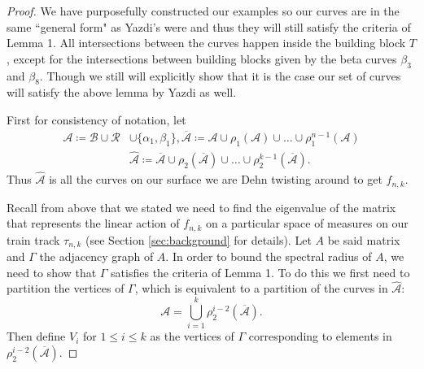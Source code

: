 \begin{proof}
We have purposefully constructed our examples so our curves are in the same ``general form" as Yazdi's were and thus they will still satisfy the criteria of Lemma 1. All intersections between the curves happen inside the building block $T$, except for the intersections between building blocks given by the beta curves $\beta_3$ and $\beta_8$. Though we still will explicitly show that it is the case our set of curves will satisfy the above lemma by Yazdi as well.

First for consistency of notation, let
\begin{align*}
    \mathcal{A} \coloneqq \mathcal{B} \cup \mathcal{R} &\cup \{\alpha_1,\beta_1\}, \overline{\mathcal{A}} \coloneqq \mathcal{A} \cup \rho_1(\mathcal{A}) \cup \dots \cup \rho_1^{n-1}(\mathcal{A}) \\
    &\hat{\mathcal{A}} \coloneqq \overline{\mathcal{A}} \cup \rho_2(\overline{\mathcal{A}}) \cup \dots \cup \rho_2^{k-1}(\overline{\mathcal{A}}).
\end{align*}
Thus $\hat{\mathcal{A}}$ is all the curves on our surface we are Dehn twisting around to get $f_{n,k}$.

Recall from above that we stated we need to find the eigenvalue of the matrix that represents the linear action of $f_{n,k}$ on a particular space of measures on our train track $\tau_{n,k}$ (see Section \ref{sec:background} for details). Let $A$ be said matrix and $\Gamma$ the adjacency graph of $A$. In order to bound the spectral radius of $A$, we need to show that $\Gamma$ satisfies the criteria of Lemma 1. To do this we first need to partition the vertices of $\Gamma$, which is equivalent to a partition of the curves in $\hat{\mathcal{A}}$: $$\mathcal{A} = \bigcup_{i=1}^k \rho_2^{i-2}(\overline{\mathcal{A}}).$$ Then define $V_i$ for $1 \leq i \leq k$ as the vertices of $\Gamma$ corresponding to elements in $\rho_2^{i-2}(\overline{\mathcal{A}})$.


\end{proof}
